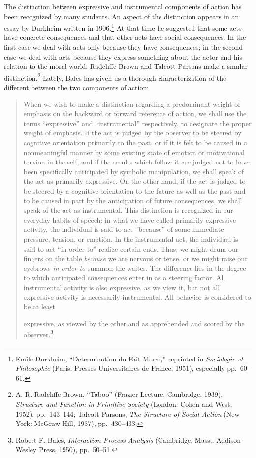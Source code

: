 \documentclass[openany,nobib]{tufte-book}
\begin{document}
The distinction between expressive and instrumental components of action
has been recognized by many students. An aspect of the distinction
appears in an essay by Durkheim written in 1906.\footnote{Emile
  Durkheim, ``Determination du Fait Moral,'' reprinted in
  \emph{Sociologie et Philosophie} (Paris: Presses Universitaires de
  France, 1951), especially pp.~60--61.} At that time he suggested that
some acts have concrete consequences and that other acts have social
consequences. In the first case we deal with acts only because they have
consequences; in the second case we deal with acts because they express
something about the actor and his relation to the moral world.
Radcliffe-Brown and Talcott Parsons make a similar
distinction.\footnote{A. R. Radcliffe-Brown, ``Taboo'' (Frazier Lecture,
  Cambridge, 1939), \emph{Structure and Function in Primitive Society}
  (London: Cohen and West, 1952), pp.~143--144; Talcott Parsons,
  \emph{The Structure of Social Action} (New York: McGraw Hill, 1937),
  pp.~430--433.} Lately, Bales has given us a thorough characterization
of the different between the two components of action:


\begin{quote}
When we wish to make a distinction regarding a predominant weight of
emphasis on the backward or forward reference of action, we shall use
the terms ``expressive'' and ``instrumental'' respectively, to designate
the proper weight of emphasis. If the act is judged by the observer to
be steered by cognitive orientation primarily to the past, or if it is
felt to be caused in a nonmeaningful manner by some existing state of
emotion or motivational tension in the self, and if the results which
follow it are judged not to have been specifically anticipated by
symbolic manipulation, we shall speak of the act as primarily
expressive. On the other hand, if the act is judged to be steered by a
cognitive orientation to the future as well as the past and to be caused
in part by the anticipation of future consequences, we shall speak of
the act as instrumental. This distinction is recognized in our everyday
habits of speech: in what we have called primarily expressive activity,
the individual is said to act ``because'' of some immediate pressure,
tension, or emotion. In the instrumental act, the individual is said to
act ``in order to'' realize certain ends. Thus, we might drum our
fingers on the table \emph{because} we are nervous or tense, or we might
raise our eyebrows \emph{in order to} summon the waiter. The difference
lies in the degree to which anticipated consequences enter in as a
steering factor. All instrumental activity is also expressive, as we
view it, but not all expressive activity is necessarily instrumental.
All behavior is considered to be at least 

\newpage expressive, as viewed by the
other and as apprehended and scored by the observer.\footnote{Robert F.
  Bales, \emph{Interaction Process Analysis} (Cambridge, Mass.:
  Addison-Wesley Press, 1950), pp.~50--51.}
\end{quote}
\end{document}
